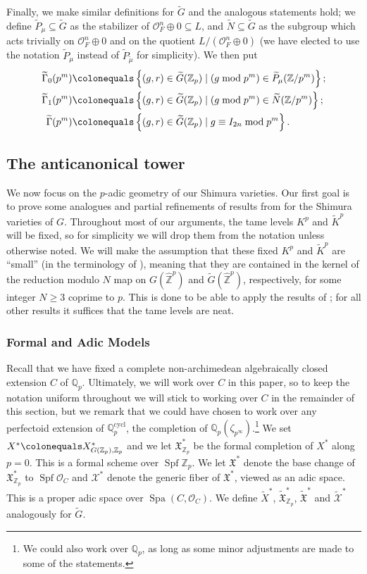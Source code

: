 \documentclass{amsart}
\theoremstyle{remark}
\numberwithin{equation}{subsection}
\newcommand{\Q}{\QQ}
\newcommand{\Z}{\ZZ}
\newcommand{\QQ}{{\mathbb Q}}
\newcommand{\ZZ}{{\mathbb Z}}
\newcommand{\cO}{{\mathcal O}}
\newcommand{\cX}{{\mathcal X}}
\newcommand{\frakX}{\mathfrak{X}}
\newcommand{\Zp}{\Z_p}
\newcommand{\Qp}{\Q_p}
\DeclareMathOperator{\Spa}{Spa}
\DeclareMathOperator{\Spf}{Spf}
\newcommand{\cycl}{\mathrm{cycl}}
\newcommand{\tG}{\widetilde{G}}
\newcommand{\tK}{{\widetilde{K}}}
\newcommand{\tN}{\widetilde{N}}
\newcommand{\tP}{\widetilde{P}}
\newcommand{\wt}{\widetilde}
\newcommand{\sub}{\subseteq}
\newcommand{\defeq}{\colonequals}
\renewcommand{\(}{\left(}
\renewcommand{\)}{\right)}
\begin{document}
Finally, we make similar definitions for $\tG$ and the analogous statements hold; we define $\tP_{\mu} \sub \tG$ as the stabilizer of $\cO_F^n \oplus 0 \sub L$, and $\tN \sub \tG$ as the subgroup which acts trivially on $\cO_F^n \oplus 0 $ and on the quotient $L/(\cO_F^n \oplus 0)$ (we have elected to use the notation $\wt{P}_\mu$ instead of $\wt{P}_{\wt{\mu}}$ for simplicity). We then put  
\begin{align*}
  \wt{\Gamma}_0(p^m) & \defeq \left\{(g,r)\in \tG(\Zp) \mid (g \bmod p^m) \in \wt{P}_{\mu}(\Z/p^m) \right\}; \\
  \wt{\Gamma}_1(p^m) & \defeq \left\{(g,r)\in \tG(\Zp) \mid (g \bmod p^m) \in \tN(\Z/p^m) \right\}; \\
  \wt{\Gamma}(p^m) & \defeq \left\{(g,r) \in \tG(\Zp) \mid g \equiv I_{2n} \bmod p^m \right\}.
\end{align*}

\subsection{The anticanonical tower}\label{subsect: anticanonical tower}

We now focus on the $p$-adic geometry of our Shimura varieties. Our first goal is to prove some analogues and partial refinements of results from \cite[\S 3.2]{scholze-galois} for the Shimura varieties of $G$. Throughout most of our arguments, the tame levels $K^p$ and $\tK^p$ will be fixed, so for simplicity we will drop them from the notation unless otherwise noted. We will make the assumption that these fixed $K^p$ and $\tK^p$ are ``small'' (in the terminology of \cite{newton-thorne}), meaning that they are contained in the kernel of the reduction modulo $N$ map on $G(\widehat{\Z}^p)$ and $\tG(\widehat{\Z}^p)$, respectively, for some integer $N\geq 3$ coprime to $p$. This is done to be able to apply the results of \cite[\S 3]{scholze-galois}; for all other results it suffices that the tame levels are neat.

\subsubsection{Formal and Adic Models}\label{subsubsect:formal_adic_models}
Recall that we have fixed a complete non-archimedean algebraically closed extension $C$ of $\Q_{p}$. Ultimately, we will work over $C$ in this paper, so to keep the notation uniform throughout we will stick to working over $C$ in the remainder of this section, but we remark that we could have chosen to work over any perfectoid extension of $\Qp^\cycl$, the completion of $\Qp(\zeta_{p^{\infty}})$.\footnote{We could also work over $\Qp$, as long as some minor adjustments are made to some of the statements.} We set $X^* \defeq X^*_{G(\Zp),\Zp}$ and we
let $\mathfrak{X}^*_{\Z_p}$ be the formal completion of $X^*$ 
along $p=0$. This is a formal scheme over $\Spf \Z_p$. We let $\mathfrak{X}^*$ denote
the base change of $\mathfrak{X}^*_{\Z_p}$ to $\Spf \cO_{C}$ and
$\cX^*$ denote the generic fiber of $\mathfrak{X}^*$, viewed as an adic space. This is a proper adic space over $\Spa (C,\cO_{C})$. We define $\wt{X}^*$, $\wt{\frakX}^*_{\Zp}$, $\wt{\frakX}^*$ and $\wt{\cX}^*$ analogously for $\tG$.
\end{document}
